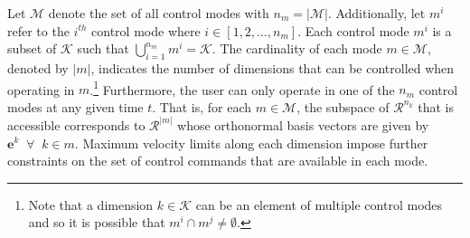 \documentclass[conference]{IEEEtran}
\newcommand{\norm}[1]{\left\lVert#1\right\rVert}
\begin{document}
 Let $\mathcal{M}$ denote the set of all control modes with $n_m = \vert\mathcal{M}\vert$. Additionally, let $m^i$ refer to the $i^{th}$ control mode where $i \in [1,2,\dots,n_m]$. Each control mode $m^i$ is a subset of $\mathcal{K}$ such that $\bigcup\limits_{i=1}^{n_m} m^i = \mathcal{K}$. The cardinality of each mode $m \in \mathcal{M}$, denoted by $\vert m \vert$, indicates the number of dimensions that can be controlled when operating in $m$.\footnote{Note that a dimension $k \in \mathcal{K}$ can be an element of multiple control modes and so it is possible that $m^i \cap m^j \neq \emptyset$.} Furthermore, the user can only operate in one of the $n_m$ control modes at any given time $t$. That is, for each $m \in \mathcal{M}$, the subspace of $\mathcal{R}^{n_k}$ that is accessible corresponds to $\mathcal{R}^{\vert m \vert}$ whose orthonormal basis vectors are given by $\boldsymbol{e}^k \;\; \forall \;\; k \in m$. Maximum velocity limits along each dimension impose further constraints on the set of control commands that are available in each mode. 
\end{document}
